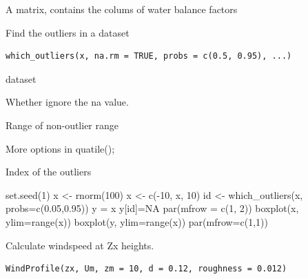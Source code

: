 \documentclass[a4paper]{book}
\begin{document}
%
\begin{Value}
A matrix, contains the colums of water balance factors
\end{Value}
%
\begin{Description}\relax
Find the outliers in a dataset
\end{Description}
%
\begin{Usage}
\begin{verbatim}
which_outliers(x, na.rm = TRUE, probs = c(0.5, 0.95), ...)
\end{verbatim}
\end{Usage}
%
\begin{Arguments}
\begin{ldescription}
\item[\code{x}] dataset

\item[\code{na.rm}] Whether ignore the na value.

\item[\code{probs}] Range of non-outlier range

\item[\code{...}] More options in quatile();
\end{ldescription}
\end{Arguments}
%
\begin{Value}
Index of the outliers
\end{Value}
%
\begin{Examples}
\begin{ExampleCode}
set.seed(1)
x <- rnorm(100)
x <- c(-10, x, 10)
id <- which_outliers(x, probs=c(0.05,0.95))
y = x
y[id]=NA
par(mfrow = c(1, 2))
boxplot(x, ylim=range(x))
boxplot(y, ylim=range(x))
par(mfrow=c(1,1))
\end{ExampleCode}
\end{Examples}
%
\begin{Description}\relax
Calculate windspeed at Zx heights.
\end{Description}
%
\begin{Usage}
\begin{verbatim}
WindProfile(zx, Um, zm = 10, d = 0.12, roughness = 0.012)
\end{verbatim}
\end{Usage}
%
\end{document}
